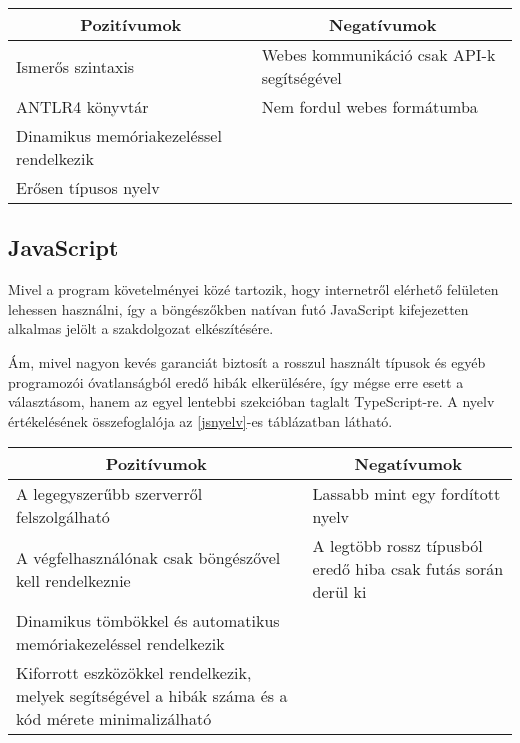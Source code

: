 \begin{center}
  \begin{tabularx}{\textwidth}{X X}
    \hline
    \multicolumn{1}{c}{\bfseries{Pozitívumok}}         & \multicolumn{1}{c}{\bfseries{Negatívumok}} \\
    \hline
    Ismerős szintaxis & Webes kommunikáció csak API-k segítségével \\
    ANTLR4 könyvtár & Nem fordul webes formátumba \\
    Dinamikus memóriakezeléssel rendelkezik \\
    Erősen típusos nyelv \\
    \hline
  \end{tabularx}
\end{center}

\newpage

\subsection{JavaScript}

Mivel a program követelményei közé tartozik, hogy internetről elérhető felületen lehessen használni, így a böngészőkben natívan futó JavaScript kifejezetten alkalmas jelölt a szakdolgozat elkészítésére.

Ám, mivel nagyon kevés garanciát biztosít a rosszul használt típusok és egyéb programozói óvatlanságból eredő hibák elkerülésére, így mégse erre esett a választásom, hanem az egyel lentebbi szekcióban taglalt TypeScript-re. A nyelv értékelésének összefoglalója az \ref{jsnyelv}-es táblázatban látható.

\begin{center}
  \begin{tabularx}{\textwidth}{X X}
    \hline
    \multicolumn{1}{c}{\bfseries{Pozitívumok}}             & \multicolumn{1}{c}{\bfseries{Negatívumok}}                    \\
    \hline
    A legegyszerűbb szerverről felszolgálható              & Lassabb mint egy fordított nyelv                              \\
    A végfelhasználónak csak böngészővel kell rendelkeznie & A legtöbb rossz típusból eredő hiba csak futás során derül ki \\
    Dinamikus tömbökkel és automatikus memóriakezeléssel rendelkezik                                                       \\
    Kiforrott eszközökkel rendelkezik, melyek segítségével a hibák száma és a kód mérete minimalizálható                   \\
    \hline
  \end{tabularx}
\end{center}

